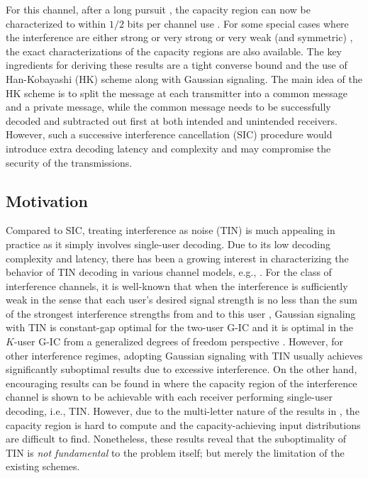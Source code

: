 \documentclass[12pt, draftclsnofoot, onecolumn]{IEEEtran}
\theoremstyle{definition}
\begin{document}
For this channel, after a long pursuit \cite{Sato1977,1055812}, the capacity region can now be characterized to within $1/2$ bits per channel use \cite{4675741}. For some special cases where the interference are either strong or very strong \cite{10.1109/TIT.1975.1055432,1056416,1057340} or very weak (and symmetric) \cite{5075903}, the exact characterizations of the capacity regions are also available. The key ingredients for deriving these results are a tight converse bound \cite{4675741} and the use of Han-Kobayashi (HK) scheme \cite{1056307,4544957} along with Gaussian signaling. The main idea of the HK scheme is to split the message at each transmitter into a common message and a private message, while the common message needs to be successfully decoded and subtracted out first at both intended and unintended receivers. However, such a successive interference cancellation (SIC) procedure would introduce extra decoding latency and complexity and may compromise the security of the transmissions.



\subsection{Motivation}
Compared to SIC, treating interference as noise (TIN) is much appealing in practice as it simply involves single-user decoding. Due to its low decoding complexity and latency, there has been a growing interest in characterizing the behavior of TIN decoding in various channel models, e.g., \cite{7051266,7106540,7322253,7422814,7486985,7496850,7742969,8113535,8700247,9112224}. For the class of interference channels, it is well-known that when the interference is sufficiently weak in the sense that each user's desired signal strength is no less than the sum of the strongest interference strengths from and to this user \cite{7051266}, Gaussian signaling with TIN is constant-gap optimal for the two-user G-IC \cite{4777648,4777617,5075903} and it is optimal in the $K$-user G-IC from a generalized degrees of freedom perspective \cite{7051266}. However, for other interference regimes, adopting Gaussian signaling with TIN usually achieves significantly suboptimal results due to excessive interference. On the other hand, encouraging results can be found in \cite{Dobrushin1963,Ahlswede1973} where the capacity region of the interference channel is shown to be achievable with each receiver performing single-user decoding, i.e., TIN. However, due to the multi-letter nature of the results in \cite{Dobrushin1963,Ahlswede1973}, the capacity region is hard to compute and the capacity-achieving input distributions are difficult to find. Nonetheless, these results reveal that the suboptimality of TIN is {\it not fundamental} to the problem itself; but merely the limitation of the existing schemes.
\end{document}

